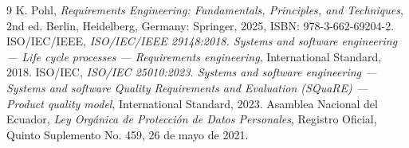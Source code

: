 \documentclass[10pt,a4paper]{article}
\begin{document}
\begin{thebibliography}{9}
 K. Pohl, \textit{Requirements Engineering: Fundamentals, Principles, and Techniques}, 2nd ed. Berlin, Heidelberg, Germany: Springer, 2025, ISBN: 978-3-662-69204-2.
 ISO/IEC/IEEE, \textit{ISO/IEC/IEEE 29148:2018. Systems and software engineering --- Life cycle processes --- Requirements engineering}, International Standard, 2018.
 ISO/IEC, \textit{ISO/IEC 25010:2023. Systems and software engineering --- Systems and software Quality Requirements and Evaluation (SQuaRE) --- Product quality model}, International Standard, 2023.
 Asamblea Nacional del Ecuador, \textit{Ley Org\'anica de Protecci\'on de Datos Personales}, Registro Oficial, Quinto Suplemento No. 459, 26 de mayo de 2021.
\end{thebibliography}
\end{document}
